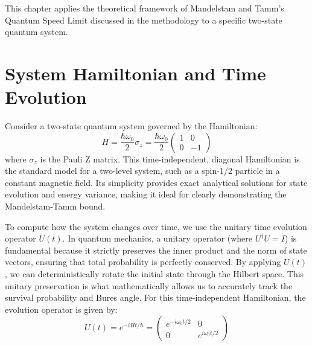 This chapter applies the theoretical framework of Mandelstam and Tamm's Quantum Speed Limit discussed in the methodology to a specific two-state quantum system.

\section{System Hamiltonian and Time Evolution}
Consider a two-state quantum system governed by the Hamiltonian:
\begin{equation}
    H = \frac{\hbar \omega_0}{2} \sigma_z = \frac{\hbar \omega_0}{2} \begin{pmatrix} 1 & 0 \\ 0 & -1 \end{pmatrix}
\end{equation}
where $\sigma_z$ is the Pauli Z matrix. This time-independent, diagonal Hamiltonian is the standard model for a two-level system, such as a spin-1/2 particle in a constant magnetic field. Its simplicity provides exact analytical solutions for state evolution and energy variance, making it ideal for clearly demonstrating the Mandelstam-Tamm bound.

To compute how the system changes over time, we use the unitary time evolution operator $U(t)$. In quantum mechanics, a unitary operator (where $U^\dagger U = I$) is fundamental because it strictly preserves the inner product and the norm of state vectors, ensuring that total probability is perfectly conserved. By applying $U(t)$, we can deterministically rotate the initial state through the Hilbert space. This unitary preservation is what mathematically allows us to accurately track the survival probability and Bures angle. For this time-independent Hamiltonian, the evolution operator is given by:
\begin{equation}
    U(t) = e^{-i H t / \hbar} = \begin{pmatrix} e^{-i \omega_0 t / 2} & 0 \\ 0 & e^{i \omega_0 t / 2} \end{pmatrix}
\end{equation}

